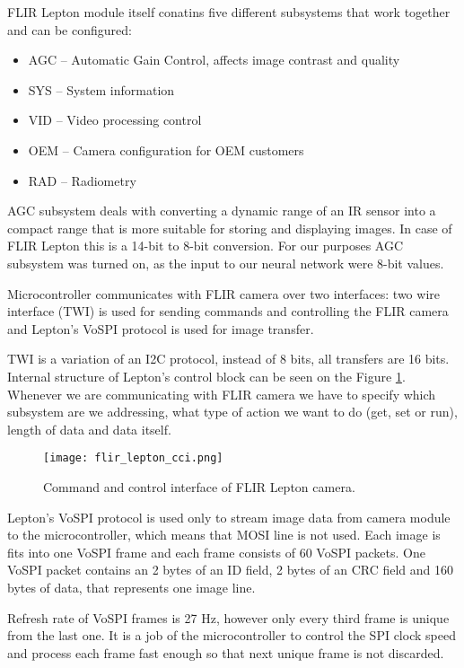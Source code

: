 FLIR Lepton module itself conatins five different subsystems that work together and can be configured:

\begin{itemize}
    \item AGC – Automatic Gain Control, affects image contrast and quality
    \item SYS – System information
    \item VID – Video processing control
    \item OEM – Camera configuration for OEM customers
    \item RAD – Radiometry
\end{itemize}

AGC subsystem deals with converting a dynamic range of an IR sensor into a compact range that is more suitable for storing and displaying images.
In case of FLIR Lepton this is a 14-bit to 8-bit conversion.
For our purposes AGC subsystem was turned on, as the input to our neural network were 8-bit values.

Microcontroller communicates with FLIR camera over two interfaces: two wire interface (TWI) is used for sending commands and controlling the FLIR camera and Lepton's VoSPI protocol is used for image transfer.

TWI is a variation of an I2C protocol, instead of 8 bits, all transfers are 16 bits.
Internal structure of Lepton's control block can be seen on the Figure \ref{flir_lepton_cci}.
Whenever we are communicating with FLIR camera we have to specify which subsystem are we addressing, what type of action we want to do (get, set or run), length of data and data itself.

\begin{figure}[ht]
        \centering
        \texttt{[image: flir\_lepton\_cci.png]} 
        \caption{ Command and control interface of FLIR Lepton camera.} 
        \label{flir_lepton_cci}
\end{figure}

Lepton's VoSPI protocol is used only to stream image data from camera module to the microcontroller, which means that MOSI line is not used.
Each image is fits into one VoSPI frame and each frame consists of 60 VoSPI packets.
One VoSPI packet contains an 2 bytes of an ID field, 2 bytes of an CRC field and 160 bytes of data\footnotemark, that represents one image line.

Refresh rate of VoSPI frames is 27 \si{\hertz}, however only every third frame is unique from the last one.
It is a job of the microcontroller to control the SPI clock speed and process each frame fast enough so that next unique frame is not discarded.

